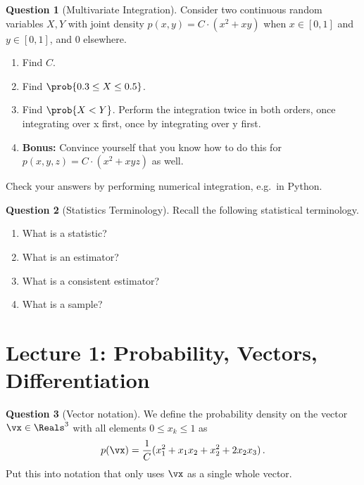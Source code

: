 \documentclass[a4paper]{article}
\theoremstyle{definition}
\newtheorem{question}{Question}
\begin{document}
\begin{question}[Multivariate Integration]
Consider two continuous random variables $X,Y$ with joint density $p(x, y) = C\cdot (x^2 + xy)$ when $x \in [0, 1]$ and $y \in [0, 1]$, and $0$ elsewhere.
\begin{enumerate}[label=\alph*.]
    \item Find $C$.
    \item Find $\prob{0.3 \leq X \leq 0.5}$.
    \item Find $\prob{X < Y}$. Perform the integration twice in both orders, once integrating over x first, once by integrating over y first.
    \item \textbf{Bonus:} Convince yourself that you know how to do this for $p(x, y, z) = C\cdot (x^2 + xyz)$ as well.
\end{enumerate}
Check your answers by performing numerical integration, e.g.~in Python.
\end{question}

\begin{question}[Statistics Terminology] Recall the following statistical terminology.
\label{q:stats-term}
\begin{enumerate}[label=\alph*.]
    \item What is a statistic?
    \item What is an estimator?
    \item What is a consistent estimator?
    \item What is a sample?
\end{enumerate}
\end{question}





\section{Lecture 1: Probability, Vectors, Differentiation}
\begin{question}[Vector notation]
We define the probability density on the vector $\vx \in \Reals^3$ with all elements $0 \leq x_k \leq 1$ as
\begin{align}
p(\vx) = \frac{1}{C} (x_1^2 + x_1x_2 + x_2^2 + 2x_2x_3) \,.
\end{align}
Put this into notation that only uses $\vx$ as a single whole vector.
\end{question}
\end{document}
